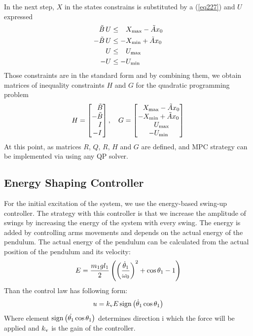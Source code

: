 In the next step, $X$ in the states constrains is substituted by a (\ref{eq227}) and $U$ expressed
\begin{subequations}
	\begin{align}
	\tilde{B}\,U &\leq \ \; \,X _{\text{max}} - \tilde{A}x_0\\
	-\tilde{B}\,U &\leq -X _{\text{min}} + \tilde{A}x_0\\
	U &\leq \ \; \,U _{\text{max}}\\
	-U &\leq -U _{\text{min}}
	\end{align}
\end{subequations}
Those constraints are in the standard form and by combining them, we obtain matrices of inequality constraints $H$ and $G$ for the quadratic programming problem
\begin{equation}
	H = \begin{bmatrix}
	\ \; \,\tilde{B}\\
	-\tilde{B}\\
	\ \ \, I\\
	-I\\
	\end{bmatrix}, \quad
	G = \begin{bmatrix}
	\ \; \,X _{\text{max}} - \tilde{A}x_0\\
	-X _{\text{min}} + \tilde{A}x_0\\
	\ \ \:U _{\text{max}}\\
	-U _{\text{min}}
	\end{bmatrix}
\end{equation}
At this point, as matrices $R$, $Q$, $R$, $H$ and $G$ are defined, and MPC strategy can be implemented via using any QP solver.
\subsection{Energy Shaping Controller}\label{energyshapingsection}
For the initial excitation of the system, we use the energy-based swing-up controller. The strategy with this controller is that we increase the amplitude of swings by increasing the energy of the system with every swing. The energy is added by controlling arms movements and depends on the actual energy of the pendulum. The actual energy of the pendulum can be calculated from the actual position of the pendulum and its velocity: 
\begin{equation}
E = \frac{m_1gl_1}{2}\left( \left( \frac{\dot{\theta}_1}{\omega_0} \right)^2+\cos\theta_1 - 1 \right)
\end{equation}
Than the control law has following form:
\begin{equation}\label{energy-shaping}
	u = k _{\text{v}}E\,\mathrm{sign}\left( \dot{\theta}_1\cos\theta_1 \right)
\end{equation}
Where element $\mathrm{sign}\left( \dot{\theta_1}\cos\theta_1 \right)$ determines direction i which the force will be applied and $k _{\text{v}}$ is the gain of the controller.
\newpage
